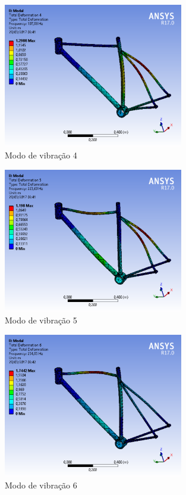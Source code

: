 \graphicspath{{figuras/}}
	\begin{figure}[h!]
	\centering
	\includegraphics[width=0.7\textwidth]{modo_de_vibracao_4.png}
	\caption{Modo de vibração 4}
	\label{img:modo_de_vibracao4}
	\end{figure}	
	
\graphicspath{{figuras/}}
	\begin{figure}[h!]
	\centering
	\includegraphics[width=0.7\textwidth]{modo_de_vibracao_5.png}
	\caption{Modo de vibração 5}
	\label{img:modo_de_vibracao5}
	\end{figure}	

\graphicspath{{figuras/}}
	\begin{figure}[h!]
	\centering
	\includegraphics[width=0.7\textwidth]{modo_de_vibracao_6.png}
	\caption{Modo de vibração 6}
	\label{img:modo_de_vibracao 6}
	\end{figure}	

